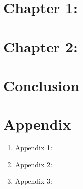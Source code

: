 \documentclass[]{article}
\begin{document}
\section*{Chapter 1: }
\subsection*{}
\subsection*{}
\section*{Chapter 2: }
\subsection*{}
\subsection*{}
\section*{Conclusion}
\section*{Appendix}



\begin{enumerate}
\item {Appendix 1:}
\item {Appendix 2:}
\item {Appendix 3:}
\end{enumerate}
\end{document}
